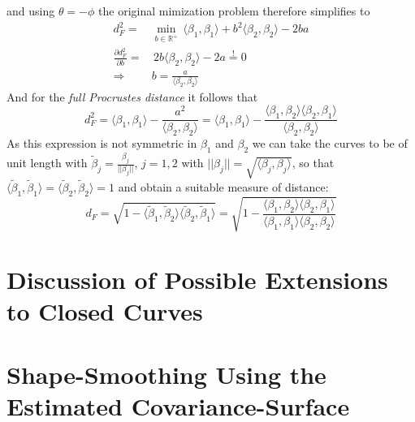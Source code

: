 and using $\theta = -\phi$ the original mimization problem therefore simplifies to
\begin{align*}
    d_F^2 =&
    \min_{b \in \mathbb{R}^+}\,
    \langle \beta_1, \beta_1 \rangle
    + b^2 \langle \beta_2, \beta_2 \rangle
    - 2 b a \\
    \frac{\partial d_F^2}{\partial b} =& \,
    2 b \langle \beta_2, \beta_2 \rangle - 2a \stackrel{!}{=} 0 \\
    \Rightarrow \quad & b = \frac{a}{\langle \beta_2, \beta_2 \rangle}
\end{align*}
And for the \textit{full Procrustes distance} it follows that
$$ d_F^2
= \langle \beta_1, \beta_1 \rangle - \frac{a^2}{\langle \beta_2, \beta_2 \rangle}
= \langle \beta_1, \beta_1 \rangle - \frac{ \langle \beta_1, \beta_2 \rangle \langle \beta_2, \beta_1 \rangle}{\langle \beta_2, \beta_2 \rangle}$$
As this expression is not symmetric in $\beta_1$ and $\beta_2$ we can take the curves to be of unit length with $\tilde{\beta}_j = \frac{\beta_j}{||\beta_j||}$, $j=1,2$ with $||\beta_j|| = \sqrt{\langle \beta_j, \beta_j \rangle}$, so that $\langle \tilde\beta_1, \tilde\beta_1 \rangle = \langle \tilde\beta_2, \tilde\beta_2 \rangle = 1$ and obtain a suitable measure of distance:
$$ d_F = \sqrt{1 - \langle \tilde\beta_1, \tilde\beta_2 \rangle
\langle \tilde\beta_2, \tilde\beta_1 \rangle}
= \sqrt{1 - \frac{ \langle \beta_1, \beta_2 \rangle \langle \beta_2, \beta_1 \rangle}{\langle \beta_1, \beta_1 \rangle \langle \beta_2, \beta_2 \rangle}}$$


\section{Discussion of Possible Extensions to Closed Curves}
\label{app:closed}


\section{Shape-Smoothing Using the Estimated Covariance-Surface}
